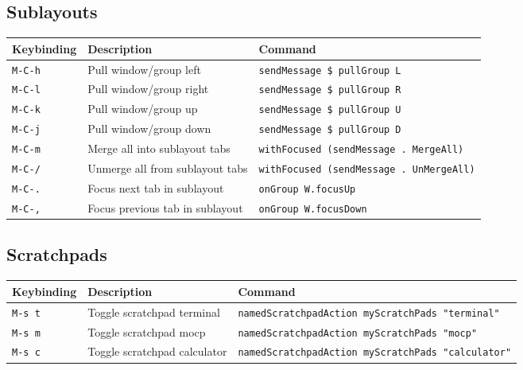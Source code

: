\hypertarget{sublayouts}{%
\subsection{Sublayouts}\label{sublayouts}}

\begin{longtable}[]{@{}
  >{\raggedright\arraybackslash}p{}
  >{\raggedright\arraybackslash}p{}
  >{\raggedright\arraybackslash}p{}@{}}
\toprule
Keybinding & Description & Command \\
\midrule
\endhead
\texttt{M-C-h} & Pull window/group left &
\texttt{sendMessage\ \$\ pullGroup\ L} \\
\texttt{M-C-l} & Pull window/group right &
\texttt{sendMessage\ \$\ pullGroup\ R} \\
\texttt{M-C-k} & Pull window/group up &
\texttt{sendMessage\ \$\ pullGroup\ U} \\
\texttt{M-C-j} & Pull window/group down &
\texttt{sendMessage\ \$\ pullGroup\ D} \\
\texttt{M-C-m} & Merge all into sublayout tabs &
\texttt{withFocused\ (sendMessage\ .\ MergeAll)} \\
\texttt{M-C-/} & Unmerge all from sublayout tabs &
\texttt{withFocused\ (sendMessage\ .\ UnMergeAll)} \\
\texttt{M-C-.} & Focus next tab in sublayout &
\texttt{onGroup\ W.focusUp\textquotesingle{}} \\
\texttt{M-C-,} & Focus previous tab in sublayout &
\texttt{onGroup\ W.focusDown\textquotesingle{}} \\
\bottomrule
\end{longtable}

\hypertarget{scratchpads}{%
\subsection{Scratchpads}\label{scratchpads}}

\begin{longtable}[]{@{}
  >{\raggedright\arraybackslash}p{}
  >{\raggedright\arraybackslash}p{}
  >{\raggedright\arraybackslash}p{}@{}}
\toprule
Keybinding & Description & Command \\
\midrule
\endhead
\texttt{M-s\ t} & Toggle scratchpad terminal &
\texttt{namedScratchpadAction\ myScratchPads\ "terminal"} \\
\texttt{M-s\ m} & Toggle scratchpad mocp &
\texttt{namedScratchpadAction\ myScratchPads\ "mocp"} \\
\texttt{M-s\ c} & Toggle scratchpad calculator &
\texttt{namedScratchpadAction\ myScratchPads\ "calculator"} \\
\bottomrule
\end{longtable}

